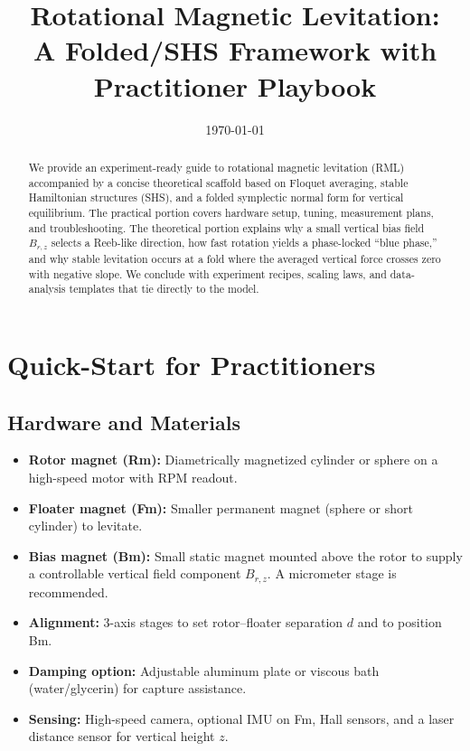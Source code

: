 \documentclass[11pt]{article}
\title{Rotational Magnetic Levitation:\\
A Folded/SHS Framework with Practitioner Playbook}
\author{ }
\date{\today}
\theoremstyle{definition}
\theoremstyle{plain}
\begin{document}
\maketitle

\begin{abstract}
We provide an experiment-ready guide to rotational magnetic levitation (RML) accompanied by a concise theoretical scaffold based on Floquet averaging, stable Hamiltonian structures (SHS), and a folded symplectic normal form for vertical equilibrium. The practical portion covers hardware setup, tuning, measurement plans, and troubleshooting. The theoretical portion explains why a small vertical bias field \(B_{r,z}\) selects a Reeb-like direction, how fast rotation yields a phase-locked “blue phase,” and why stable levitation occurs at a fold where the averaged vertical force crosses zero with negative slope. We conclude with experiment recipes, scaling laws, and data-analysis templates that tie directly to the model.
\end{abstract}

\tableofcontents

\section{Quick-Start for Practitioners}

\subsection{Hardware and Materials}
\begin{itemize}[leftmargin=1.5em]
  \item \textbf{Rotor magnet (Rm):} Diametrically magnetized cylinder or sphere on a high-speed motor with RPM readout.
  \item \textbf{Floater magnet (Fm):} Smaller permanent magnet (sphere or short cylinder) to levitate.
  \item \textbf{Bias magnet (Bm):} Small static magnet mounted above the rotor to supply a controllable vertical field component \(B_{r,z}\). A micrometer stage is recommended.
  \item \textbf{Alignment:} 3-axis stages to set rotor--floater separation \(d\) and to position Bm.
  \item \textbf{Damping option:} Adjustable aluminum plate or viscous bath (water/glycerin) for capture assistance.
  \item \textbf{Sensing:} High-speed camera, optional IMU on Fm, Hall sensors, and a laser distance sensor for vertical height \(z\).
\end{itemize}
\end{document}
